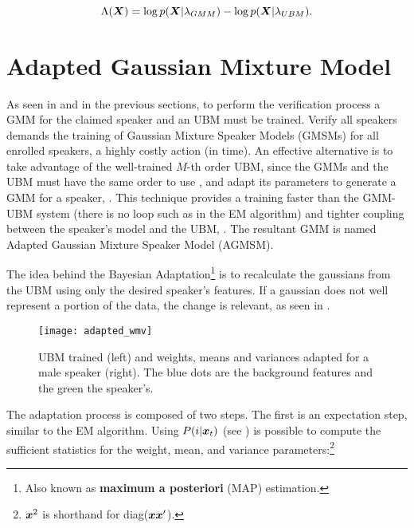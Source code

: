 \begin{equation}
    \Lambda(\dvec{X}) = \log p(\dvec{X}|\lambda_{GMM}) - \log p(\dvec{X}|\lambda_{UBM}).
    \label{eq:score_of_X_gmm_ubm}
\end{equation}

\section{Adapted Gaussian Mixture Model}
\label{sec:adapted-gmm}

As seen in  and in the previous sections, to perform the verification process a GMM for the claimed speaker and an UBM must be trained. Verify all speakers demands the training of Gaussian Mixture Speaker Models (GMSMs) for all enrolled speakers, a highly costly action (in time). An effective alternative is to take advantage of the well-trained $M$-th order UBM, since the GMMs and the UBM must have the same order to use , and adapt its parameters to generate a GMM for a speaker, . This technique provides a training faster than the GMM-UBM system (there is no loop such as in the EM algorithm) and tighter coupling between the speaker’s model and the UBM, . The resultant GMM is named Adapted Gaussian Mixture Speaker Model (AGMSM).

The idea behind the Bayesian Adaptation\footnote{Also known as \textbf{maximum a posteriori} (MAP) estimation.} is to recalculate the gaussians from the UBM using only the desired speaker's features. If a gaussian does not well represent a portion of the data, the change is relevant, as seen in .

\begin{figure}[ht]
    \centering
    \texttt{[image: adapted\_wmv]}
    \caption{UBM trained (left) and weights, means and variances adapted for a male speaker (right). The blue dots are the background features and the green the speaker's.}
    \label{fig:adapted_wmv}
\end{figure}

The adaptation process is composed of two steps. The first is an expectation step, similar to the EM algorithm. Using $P(i|\boldsymbol{x}_t)$ (see ) is possible to compute the sufficient statistics for the weight, mean, and variance parameters:\footnote{$\boldsymbol{x}^2$ is shorthand for diag($\boldsymbol{x}\boldsymbol{x}'$).}

